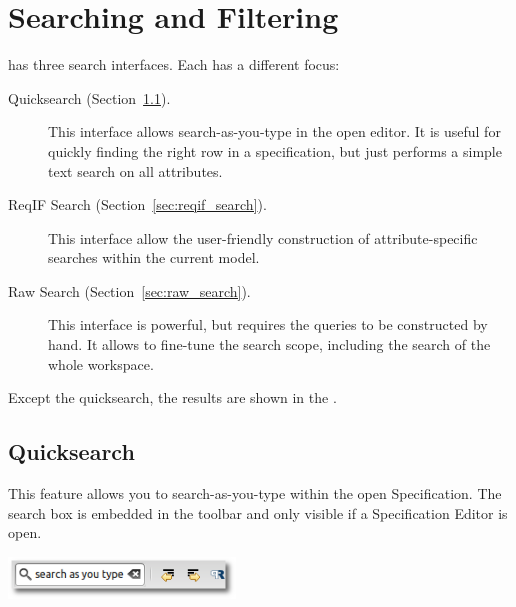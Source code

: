 \section{Searching and Filtering}
\label{sec:search}

\pror{} has three search interfaces.  Each has a different focus:

\begin{description}
\item[Quicksearch (Section~\ref{sec:quicksearch}).] This interface allows search-as-you-type in the open editor.  It is useful for quickly finding the right row in a specification, but just performs a simple text search on all attributes.
\item[ReqIF Search (Section~\ref{sec:reqif_search}).] This interface allow the user-friendly construction of attribute-specific searches within the current model.
\item[Raw Search (Section~\ref{sec:raw_search}).] This interface is powerful, but requires the queries to be constructed by hand.  It allows to fine-tune the search scope, including the search of the whole workspace.
\end{description}

Except the quicksearch, the results are shown in the .

\subsection{Quicksearch}
\label{sec:quicksearch}

This feature allows you to search-as-you-type within the open Specification.  The search box is embedded in the toolbar and only visible if a Specification Editor is open.

\begin{center}
\includegraphics[height=3em]{../rmf-images/quicksearch.png}
\end{center}

